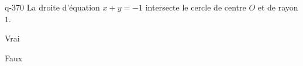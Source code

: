 \begin{truefalse}{q-370}
La droite d'équation $x+y=-1$ intersecte le cercle de centre $O$ et de rayon $1$.
\item* Vrai
\item Faux
\end{truefalse}

